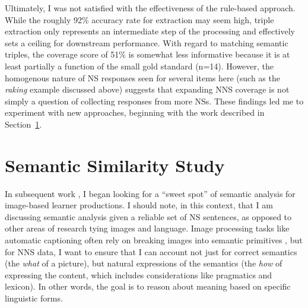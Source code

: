 Ultimately, I was not satisfied with the effectiveness of the rule-based approach. While the roughly 92\% accuracy rate for extraction may seem high, triple extraction only represents an intermediate step of the processing and effectively sets a ceiling for downstream performance. With regard to matching semantic triples, the coverage score of 51\% is somewhat less informative because it is at least partially a function of the small gold standard (n=14). However, the homogenous nature of NS responses seen for several items here (such as the \textit{raking} example discussed above) suggests that expanding NNS coverage is not simply a question of collecting responses from more NSs. These findings led me to experiment with new approaches, beginning with the work described in Section~\ref{sec:2016work}.


\section{Semantic Similarity Study}
\label{sec:2016work}

In subsequent work \citep{king:dickinson:16}, I began looking for a ``sweet spot'' of
semantic analysis \citep[cf.][]{bailey:meurers:08} for image-based learner productions. I should note, in this context, that I am discussing semantic analysis given a reliable set of NS sentences, as opposed to other areas of research tying images and language. Image processing tasks like automatic captioning often rely on breaking images into semantic primitives \citep[see, e.g.,][and references therein]{ortiz:wolff:lapata:15}, but for NNS data, I want to ensure that I can account not just for correct semantics (the \emph{what} of a picture), but natural expressions of the semantics (the \emph{how} of expressing the content, which includes considerations like pragmatics and lexicon).  In other words, the goal is to reason about meaning based on specific linguistic forms.

